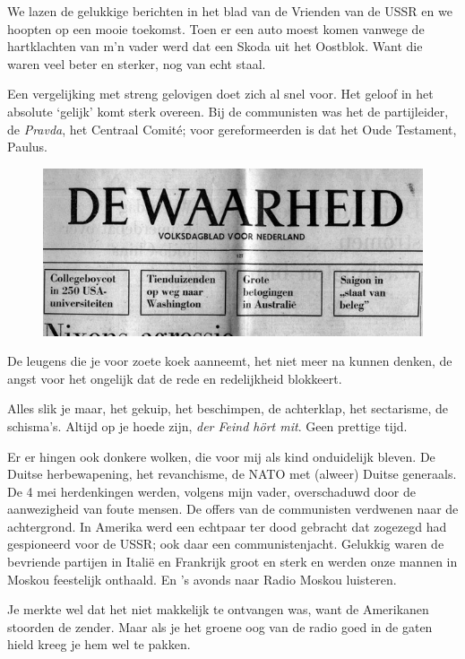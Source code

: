 \documentclass[10pt,twoside, openright]{memoir}
\begin{document}
We lazen de gelukkige berichten in het blad van de Vrienden van de USSR en we hoopten op een mooie toekomst. Toen er een auto moest komen vanwege de hartklachten van m’n vader werd dat een Skoda uit het Oostblok. Want die waren veel beter en sterker, nog van echt staal. 

Een vergelijking met streng gelovigen doet zich al snel voor. Het geloof in het absolute ‘gelijk’ komt sterk overeen. Bij de communisten was het de partijleider, de \emph{Pravda}, het Centraal Comité; voor gereformeerden is dat het Oude Testament, Paulus. 

\begin{figure}
\includegraphics[width=\textwidth]{img/ch17/waarheid}
\end{figure}

De leugens die je voor zoete koek aanneemt, het niet meer na kunnen denken, de angst voor het ongelijk dat de rede en redelijkheid blokkeert. 

Alles slik je maar, het gekuip, het beschimpen, de achterklap, het sectarisme, de schisma's. Altijd op je hoede zijn, \emph{der Feind hört mit}. Geen prettige tijd. 

Er er hingen ook donkere wolken, die voor mij als kind onduidelijk bleven. De Duitse herbewapening, het revanchisme, de NATO met (alweer) Duitse generaals. De 4 mei herdenkingen werden, volgens mijn vader, overschaduwd door de aanwezigheid van foute mensen. De offers van de communisten verdwenen naar de achtergrond. In Amerika werd een echtpaar ter dood gebracht dat zogezegd had gespioneerd voor de USSR; ook daar een communistenjacht. Gelukkig waren de bevriende partijen in Italië en Frankrijk groot en sterk en werden onze mannen in Moskou feestelijk onthaald. En ’s avonds naar Radio Moskou luisteren. 

Je merkte wel dat het niet makkelijk te ontvangen was, want de Amerikanen stoorden de zender. Maar als je het groene oog van de radio goed in de gaten hield kreeg je hem wel te pakken. 
\end{document}
